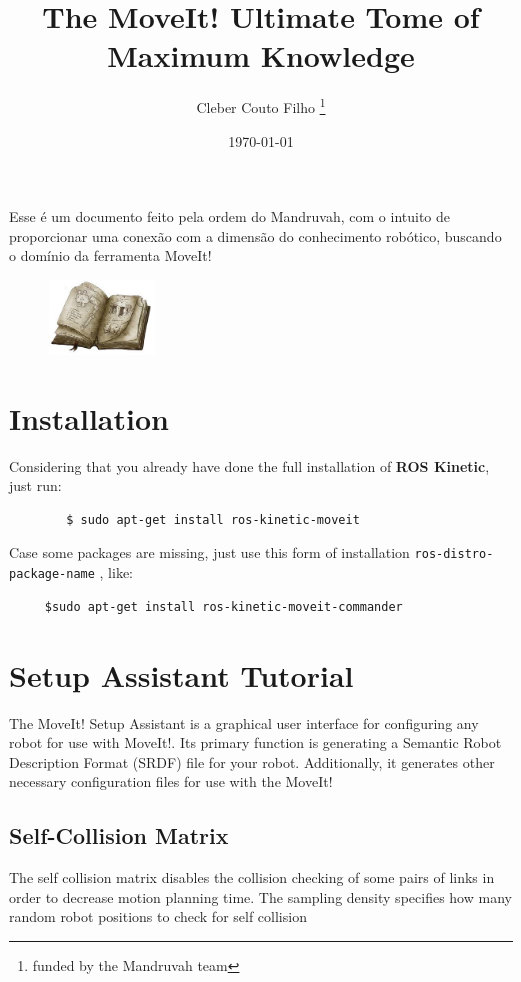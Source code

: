 \documentclass[12pt, a4paper, oneside]{article}
\title{The MoveIt! Ultimate Tome of Maximum Knowledge}
\author{Cleber Couto Filho \thanks{funded by the Mandruvah team}}
\date{\today}
\begin{document}
	\maketitle
	Esse é um documento feito pela ordem do Mandruvah, com o intuito de proporcionar uma conexão
	com a dimensão do conhecimento robótico, buscando o domínio da ferramenta MoveIt!
	
	\begin{figure}[h]
			\centering
			\includegraphics[width=0.25\textwidth]{tome.jpeg}
	\end{figure}
		
	\section{Installation}
	Considering that you already have done the full installation of \textbf{ROS Kinetic}, just run:
	
		\begin{lstlisting}
		$ sudo apt-get install ros-kinetic-moveit
		\end{lstlisting}
	Case some packages are missing, just use this form of installation \texttt{ros\--distro\--package\--name} , like:
	
	\begin{lstlisting}
	 $sudo apt-get install ros-kinetic-moveit-commander
	\end{lstlisting}
	
	
	\section{Setup Assistant Tutorial}
	The MoveIt! Setup Assistant is a graphical user interface for configuring any robot for use with MoveIt!. Its primary function is generating a Semantic Robot Description Format (SRDF) file for your robot. Additionally, it generates other necessary configuration files for use with the MoveIt!
	
	
	\subsection{Self-Collision Matrix}
	The self collision matrix disables the collision checking of some pairs of links in order to decrease motion planning time. The sampling density specifies how many random robot positions to check for self collision
		
\end{document}
